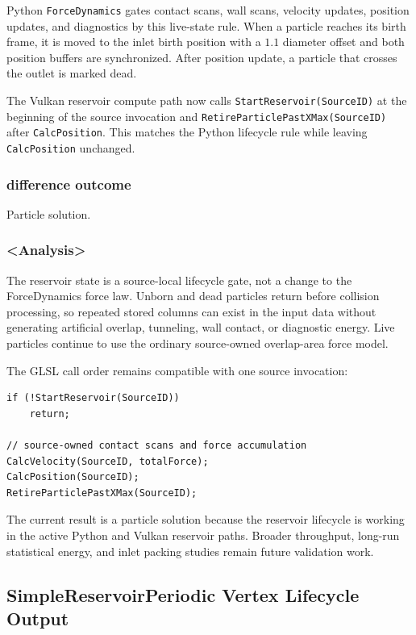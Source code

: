 Python \texttt{ForceDynamics} gates contact scans, wall scans, velocity
updates, position updates, and diagnostics by this live-state rule.  When a
particle reaches its birth frame, it is moved to the inlet birth position with
a \(1.1\) diameter offset and both position buffers are synchronized.  After
position update, a particle that crosses the outlet is marked dead.

The Vulkan reservoir compute path now calls
\texttt{StartReservoir(SourceID)} at the beginning of the source invocation and
\texttt{RetireParticlePastXMax(SourceID)} after \texttt{CalcPosition}.  This
matches the Python lifecycle rule while leaving \texttt{CalcPosition}
unchanged.

\subsubsection{difference outcome}

Particle solution.

\subsubsection{<Analysis>}

The reservoir state is a source-local lifecycle gate, not a change to the
ForceDynamics force law.  Unborn and dead particles return before collision
processing, so repeated stored columns can exist in the input data without
generating artificial overlap, tunneling, wall contact, or diagnostic energy.
Live particles continue to use the ordinary source-owned overlap-area force
model.

The GLSL call order remains compatible with one source invocation:
\begin{verbatim}
if (!StartReservoir(SourceID))
    return;

// source-owned contact scans and force accumulation
CalcVelocity(SourceID, totalForce);
CalcPosition(SourceID);
RetireParticlePastXMax(SourceID);
\end{verbatim}

The current result is a particle solution because the reservoir lifecycle is
working in the active Python and Vulkan reservoir paths.  Broader throughput,
long-run statistical energy, and inlet packing studies remain future
validation work.

\subsection{SimpleReservoirPeriodic Vertex Lifecycle Output}

